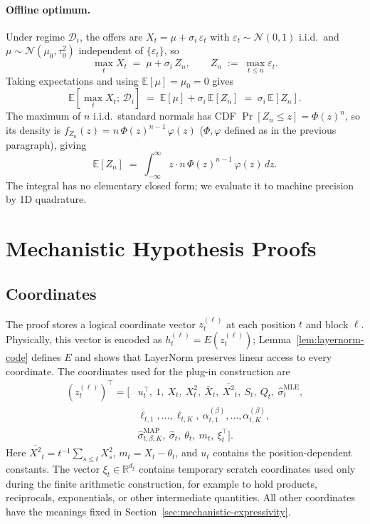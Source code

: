 \documentclass[11pt]{article}
\begin{document}
\paragraph{Offline optimum.} Under regime $\mathcal{D}_i$, the offers are $X_t = \mu + \sigma_i\,\varepsilon_t$ with $\varepsilon_t \sim \mathcal{N}(0, 1)$ i.i.d.\ and $\mu \sim \mathcal{N}(\mu_0, \tau_0^2)$ independent of $\{\varepsilon_t\}$, so
\[
\max_t X_t \;=\; \mu + \sigma_i\, Z_n, \qquad Z_n \;:=\; \max_{t \le n} \varepsilon_t.
\]
Taking expectations and using $\mathbb{E}[\mu] = \mu_0 = 0$ gives
\[
\mathbb{E}[\max_t X_t;\, \mathcal{D}_i] \;=\; \mathbb{E}[\mu] + \sigma_i\, \mathbb{E}[Z_n] \;=\; \sigma_i\, \mathbb{E}[Z_n].
\]
The maximum of $n$ i.i.d.\ standard normals has CDF $\Pr[Z_n \le z] = \Phi(z)^n$, so its density is $f_{Z_n}(z) = n\,\Phi(z)^{n-1}\,\varphi(z)$ ($\Phi, \varphi$ defined as in the previous paragraph), giving
\[
\mathbb{E}[Z_n] \;=\; \int_{-\infty}^{\infty} z \cdot n\,\Phi(z)^{n-1}\,\varphi(z)\, dz.
\]
The integral has no elementary closed form; we evaluate it to machine precision by 1D quadrature.

\section{Mechanistic Hypothesis Proofs}
\label{app:mechanistic-expressivity-proofs}

\subsection{Coordinates}
\label{app:construction-primitives}

The proof stores a logical coordinate vector \(z_t^{(\ell)}\) at each position \(t\) and block \(\ell\). Physically, this vector is encoded as \(h_t^{(\ell)}=E(z_t^{(\ell)})\); Lemma~\ref{lem:layernorm-code} defines \(E\) and shows that LayerNorm preserves linear access to every coordinate. The coordinates used for the plug-in construction are
\begin{equation}
\label{eq:plugin-coordinate-layout}
\begin{aligned}
(z_t^{(\ell)})^\top
=
\bigl[&
u_t^\top,\ 1,\ X_t,\ X_t^2,\ \bar X_t,\ \overline{X^2}_t,\ S_t,\ Q_t,\ \widehat\sigma_t^{\mathrm{MLE}},\\
&
\ell_{t,1},\ldots,\ell_{t,K},\
\alpha_{t,1}^{(\beta)},\ldots,\alpha_{t,K}^{(\beta)},\\
&
\widehat\sigma^{\mathrm{MAP}}_{t,\beta,K},\
\widehat\sigma_t,\ \theta_t,\ m_t,\ \xi_t^\top
\bigr].
\end{aligned}
\end{equation}
Here \(\overline{X^2}_t=t^{-1}\sum_{s\le t}X_s^2\), \(m_t=X_t-\theta_t\), and \(u_t\) contains the position-dependent constants. The vector \(\xi_t\in\mathbb R^{d_\xi}\) contains temporary scratch coordinates used only during the finite arithmetic construction, for example to hold products, reciprocals, exponentials, or other intermediate quantities. All other coordinates have the meanings fixed in Section~\ref{sec:mechanistic-expressivity}.
\end{document}
